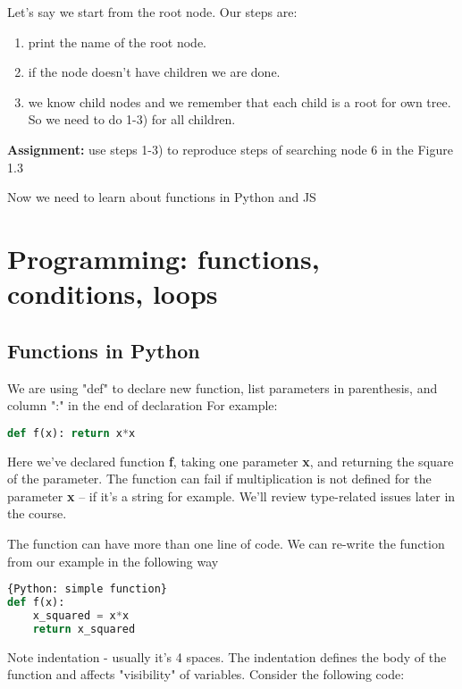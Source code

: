 Let's say we start from the root node. Our steps are:

\begin{leftborder}
\begin{enumerate}
\item print the name of the root node.
\item if the node doesn't have children we are done.
\item we know child nodes and we remember that each child is a root for own tree.
So we need to do 1-3) for all children.
\end{enumerate}
\end{leftborder}

\bigskip
\begin{tcolorbox}
\textbf{Assignment:} use steps 1-3) to reproduce 
steps of searching node 6 in
the Figure 1.3 
\end{tcolorbox}

Now we need to learn about functions in Python and JS

\section{Programming: functions, conditions, loops}
\subsection{Functions in Python}

We are using "def" to declare new function, list parameters in
parenthesis, and column ":" in the end of declaration
For example:

\begin{lstlisting}[style=codelst,language=Python]
def f(x): return x*x
\end{lstlisting}

Here we've declared function \textbf{f}, taking one parameter \textbf{x},
and returning the square of the parameter. The function
can fail if multiplication is not defined for the parameter \textbf{x} --
if it's a string for example. We'll review type-related
issues later in the course.

The function can have more than one line of code. We can re-write
the function from our example in the following way

\begin{lstlisting}[style=codelst,language=Python]{Python: simple function}
def f(x):
    x_squared = x*x
    return x_squared
\end{lstlisting}
Note indentation - usually it's 4 spaces. The indentation defines
the body of the function and affects "visibility" of variables. Consider the
following code:

